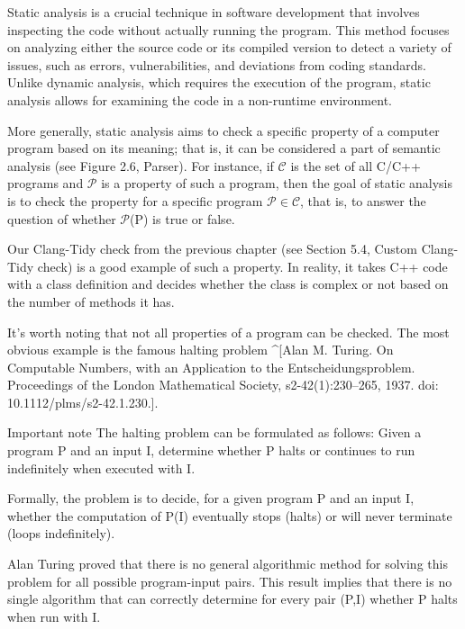 Static analysis is a crucial technique in software development that involves inspecting the code without actually running the program. This method focuses on analyzing either the source code or its compiled version to detect a variety of issues, such as errors, vulnerabilities, and deviations from coding standards. Unlike dynamic analysis, which requires the execution of the program, static analysis allows for examining the code in a non-runtime environment.

More generally, static analysis aims to check a specific property of a computer program based on its meaning; that is, it can be considered a part of semantic analysis (see Figure 2.6, Parser). For instance, if $\mathcal{C}$ is the set of all C/C++ programs and $\mathcal{P}$ is a property of such a program, then the goal of static analysis is to check the property for a specific program $\mathcal{P} \in \mathcal{C}$, that is, to answer the question of whether $\mathcal{P}$(P) is true or false.

Our Clang-Tidy check from the previous chapter (see Section 5.4, Custom Clang-Tidy check) is a good example of such a property. In reality, it takes C++ code with a class definition and decides whether the class is complex or not based on the number of methods it has.

\begin{markdown}
It's worth noting that not all properties of a program can be checked. The most obvious example is the famous halting problem ^[Alan M. Turing. On Computable Numbers, with an Application to the Entscheidungsproblem. Proceedings of the London Mathematical Society, s2-42(1):230–265, 1937. doi: 10.1112/plms/s2-42.1.230.].
\end{markdown}

\begin{myNotic}{Important note}
The halting problem can be formulated as follows: Given a program P and an input I, determine whether P halts or continues to run indefinitely when executed with I.
\end{myNotic}

Formally, the problem is to decide, for a given program P and an input I, whether the computation of P(I) eventually stops (halts) or will never terminate (loops indefinitely).

Alan Turing proved that there is no general algorithmic method for solving this problem for all possible program-input pairs. This result implies that there is no single algorithm that can correctly determine for every pair (P,I) whether P halts when run with I.

